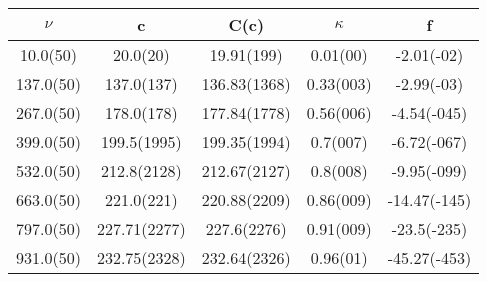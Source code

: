 \begin{table}[H]
	\centering
	\begin{tabular}{ccccc}
		$\nu$ & c & C(c) & $\kappa$ & f\\
		\hline
		10.0(50) & 20.0(20) & 19.91(199) & 0.01(00) & -2.01(-02)	\\
		137.0(50) & 137.0(137) & 136.83(1368) & 0.33(003) & -2.99(-03)	\\
		267.0(50) & 178.0(178) & 177.84(1778) & 0.56(006) & -4.54(-045)	\\
		399.0(50) & 199.5(1995) & 199.35(1994) & 0.7(007) & -6.72(-067)	\\
		532.0(50) & 212.8(2128) & 212.67(2127) & 0.8(008) & -9.95(-099)	\\
		663.0(50) & 221.0(221) & 220.88(2209) & 0.86(009) & -14.47(-145)	\\
		797.0(50) & 227.71(2277) & 227.6(2276) & 0.91(009) & -23.5(-235)	\\
		931.0(50) & 232.75(2328) & 232.64(2326) & 0.96(01) & -45.27(-453)	\\
	\end{tabular}
\end{table}